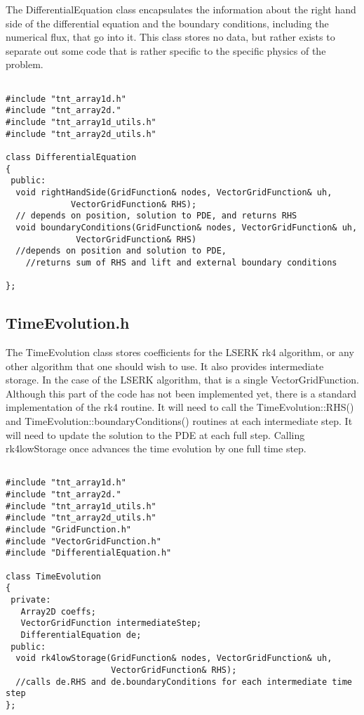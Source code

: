 \documentclass{article}
\begin{document}
The DifferentialEquation class encapsulates the information about the
right hand side of the differential equation and the boundary
conditions, including the numerical flux, that go into it. This class
stores no data, but rather exists to separate out some code that is
rather specific to the specific physics of the problem.

\begin{verbatim}

#include "tnt_array1d.h"
#include "tnt_array2d."
#include "tnt_array1d_utils.h"
#include "tnt_array2d_utils.h"

class DifferentialEquation
{
 public:
  void rightHandSide(GridFunction& nodes, VectorGridFunction& uh, 
		     VectorGridFunction& RHS);
  // depends on position, solution to PDE, and returns RHS
  void boundaryConditions(GridFunction& nodes, VectorGridFunction& uh, 
			  VectorGridFunction& RHS)
  //depends on position and solution to PDE, 
    //returns sum of RHS and lift and external boundary conditions

};
\end{verbatim}

\subsection{TimeEvolution.h}

The TimeEvolution class stores coefficients for the LSERK rk4
algorithm, or any other algorithm that one should wish to use. It also
provides intermediate storage. In the case of the LSERK algorithm,
that is a single VectorGridFunction. Although this part of the code
has not been implemented yet, there is a standard implementation of
the rk4 routine. It will need to call the TimeEvolution::RHS() and
TimeEvolution::boundaryConditions() routines at each intermediate
step. It will need to update the solution to the PDE at each full
step. Calling rk4lowStorage once advances the time evolution by one
full time step.

\begin{verbatim}

#include "tnt_array1d.h"
#include "tnt_array2d."
#include "tnt_array1d_utils.h"
#include "tnt_array2d_utils.h"
#include "GridFunction.h"
#include "VectorGridFunction.h"
#include "DifferentialEquation.h"

class TimeEvolution
{
 private:
   Array2D coeffs;
   VectorGridFunction intermediateStep;
   DifferentialEquation de;
 public:
  void rk4lowStorage(GridFunction& nodes, VectorGridFunction& uh, 
                     VectorGridFunction& RHS);
  //calls de.RHS and de.boundaryConditions for each intermediate time step
};
    
\end{verbatim}
\end{document}
